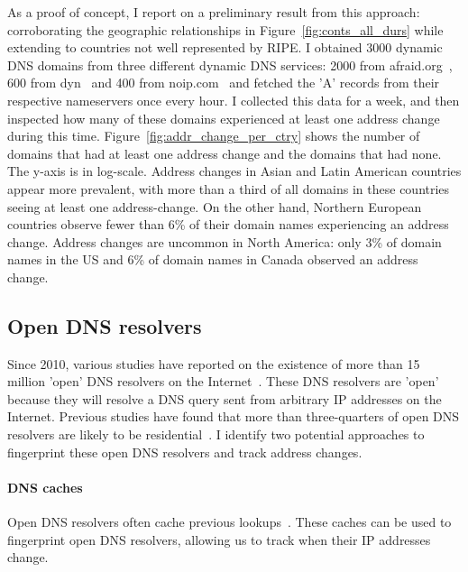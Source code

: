 As a proof of concept, I report on a preliminary result from this
approach: corroborating the geographic relationships in Figure~\ref{fig:conts_all_durs} 
while extending to countries not well represented by RIPE.
I
obtained 3000 dynamic DNS domains from three different dynamic DNS
services: 2000 from afraid.org~\cite{afraid}, 600 from dyn~\cite{dyn} and 400 from
noip.com~\cite{noip} and fetched the 'A' records from their respective
nameservers once every hour. I collected this data for a week, and
then inspected how many of these domains experienced at least one
address change during this time. Figure~\ref{fig:addr_change_per_ctry}
shows the number of domains that had at least one 
address change and the domains that had none. The y-axis is in log-scale. 
Address changes in Asian and Latin American countries appear
more prevalent, with more than a third of all domains in these
countries seeing at least one address-change. On the other hand,
Northern European countries observe fewer than 6\% of their domain names
experiencing an address change. Address changes are uncommon in
North America: only 3\% of domain names in the US and 6\% of domain
names in Canada observed an address change.

\subsection{Open DNS resolvers}

Since 2010, various studies have reported on the existence of more
than 15 million 'open' DNS resolvers on the
Internet~\cite{openresolver, schomp2014clientsidedns, kuhrer2014exit,
  kuhrer2015going}. These DNS resolvers are 'open' because they will resolve a DNS query sent from arbitrary IP
addresses on the Internet. Previous studies have found that more than
three-quarters of open DNS resolvers are likely to be
residential~\cite{schomp2014dnsvul, schomp2014clientsidedns}. I
identify two potential approaches to fingerprint these open DNS
resolvers and track address changes.

\paragraph{DNS caches}
Open DNS resolvers often cache previous
lookups~\cite{schomp2014dnsvul}. These caches can
be used to fingerprint open DNS resolvers, allowing us to track when
their IP addresses change. 

